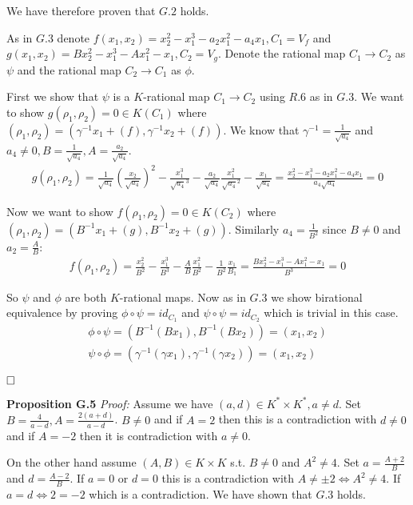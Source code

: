 \documentclass[12pt, a4paper]{article}
\newcommand{\qed}{\hfill\square}
\begin{document}
We have therefore proven that $G.2$ holds.

As in $G.3$ denote $f(x_1,x_2) = x_2^2-x_1^3-a_2x_1^2-a_4x_1, C_1 = V_f$ and $g(x_1,x_2) = Bx_2^2-x_1^3-Ax_1^2-x_1, C_2 = V_g$. Denote the rational map $C_1 \rightarrow C_2$ as $\psi$ and the rational map $C_2 \rightarrow C_1$ as $\phi$.

First we show that $\psi$ is a $K$-rational map $C_1 \rightarrow C_2$ using $R.6$ as in $G.3$. We want to show $g(\rho_1, \rho_2) = 0 \in K(C_1)$ where $(\rho_1, \rho_2) = \left(\gamma^{-1}x_1 + (f), \gamma^{-1}x_2 + (f) \right)$. We know that $\gamma^{-1} = \frac{1}{\sqrt{a_4}}$ and $a_4 \neq 0, B = \frac{1}{\sqrt{a_4}}, A = \frac{a_2}{\sqrt{a_4}}$.
\begin{gather*}
g(\rho_1, \rho_2) = \frac{1}{\sqrt{a_4}}\left( \frac{x_2}{\sqrt{a_4}} \right)^2 - \frac{x_1^3}{\sqrt{a_4}^3} - \frac{a_2}{\sqrt{a_4}}\frac{x_1^2}{\sqrt{a_4}^2} - \frac{x_1}{\sqrt{a_4}} = \frac{x_2^2-x_1^3-a_2x_1^2-a_4x_1}{a_4\sqrt{a_4}} = 0
\end{gather*} 

Now we want to show $f(\rho_1, \rho_2) = 0 \in K(C_2)$ where $(\rho_1, \rho_2) = \left( B^{-1}x_1 + (g), B^{-1}x_2+(g) \right)$. Similarly $a_4 = \frac{1}{B^2}$ since $B \neq 0$ and $a_2 = \frac{A}{B}$:
\begin{gather*}
f(\rho_1, \rho_2) = \frac{x_2^2}{B^2} - \frac{x_1^3}{B^3} - \frac{A}{B}\frac{x_1^2}{B^2}-\frac{1}{B^2}\frac{x_1}{B_1} = \frac{Bx_2^2-x_1^3-Ax_1^2-x_1}{B^3} = 0
\end{gather*}

So $\psi$ and $\phi$ are both $K$-rational maps. Now as in $G.3$ we show birational equivalence by proving $\phi \circ \psi = id_{C_1}$ and $\psi \circ \psi = id_{C_2}$ which is trivial in this case.
\begin{gather*}
\phi \circ \psi = (B^{-1}(Bx_1), B^{-1}(Bx_2)) = (x_1, x_2)\\
\psi \circ \phi = (\gamma^{-1}(\gamma x_1), \gamma^{-1}(\gamma x_2)) = (x_1, x_2)
\end{gather*}

$\qed$

\textbf{Proposition G.5} \textit{Proof:}
Assume we have $(a,d) \in K^* \times K^*, a \neq d$. Set $B =  \frac{4}{a-d}, A = \frac{2(a+d)}{a-d}$. $B \neq 0$ and if $A = 2$ then this is a contradiction with $d \neq 0$ and if $A = -2$ then it is contradiction with $a \neq 0$. 

On the other hand assume $(A,B) \in K \times K$ s.t. $B \neq 0$ and $A^2 \neq 4$. Set $a = \frac{A+2}{B}$ and $d = \frac{A-2}{B}$. If $a = 0$ or $d = 0$ this is a contradiction with $A \neq \pm 2 \iff A^2 \neq 4$. If $a=d \iff 2=-2$ which is a contradiction. We have shown that $G.3$ holds.
\end{document}
